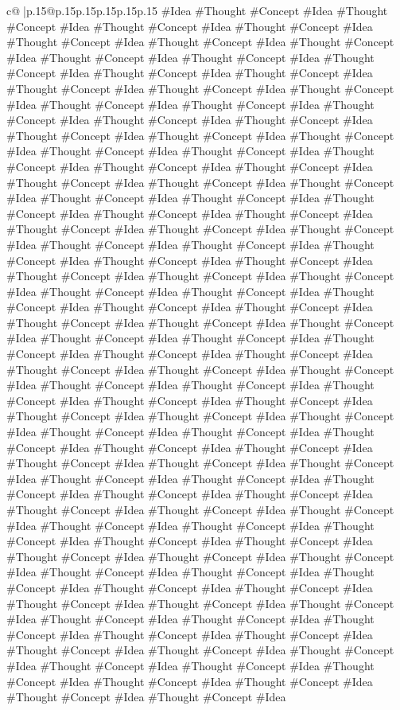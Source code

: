 \documentclass{article}
\begin{document}
{\begin{supertabular}{c@{$\;$}|p{.15\linewidth}@{}p{.15\linewidth}p{.15\linewidth}p{.15\linewidth}p{.15\linewidth}p{.15\linewidth}}
{{{\#Idea \#Thought \#Concept \#Idea \#Thought \#Concept \#Idea \#Thought \#Concept \#Idea \#Thought \#Concept \#Idea \#Thought \#Concept \#Idea \#Thought \#Concept \#Idea \#Thought \#Concept \#Idea \#Thought \#Concept \#Idea \#Thought \#Concept \#Idea \#Thought \#Concept \#Idea \#Thought \#Concept \#Idea \#Thought \#Concept \#Idea \#Thought \#Concept \#Idea \#Thought \#Concept \#Idea \#Thought \#Concept \#Idea \#Thought \#Concept \#Idea \#Thought \#Concept \#Idea \#Thought \#Concept \#Idea \#Thought \#Concept \#Idea \#Thought \#Concept \#Idea \#Thought \#Concept \#Idea \#Thought \#Concept \#Idea \#Thought \#Concept \#Idea \#Thought \#Concept \#Idea \#Thought \#Concept \#Idea \#Thought \#Concept \#Idea \#Thought \#Concept \#Idea \#Thought \#Concept \#Idea \#Thought \#Concept \#Idea \#Thought \#Concept \#Idea \#Thought \#Concept \#Idea \#Thought \#Concept \#Idea \#Thought \#Concept \#Idea \#Thought \#Concept \#Idea \#Thought \#Concept \#Idea \#Thought \#Concept \#Idea \#Thought \#Concept \#Idea \#Thought \#Concept \#Idea \#Thought \#Concept \#Idea \#Thought \#Concept \#Idea \#Thought \#Concept \#Idea \#Thought \#Concept \#Idea \#Thought \#Concept \#Idea \#Thought \#Concept \#Idea \#Thought \#Concept \#Idea \#Thought \#Concept \#Idea \#Thought \#Concept \#Idea \#Thought \#Concept \#Idea \#Thought \#Concept \#Idea \#Thought \#Concept \#Idea \#Thought \#Concept \#Idea \#Thought \#Concept \#Idea \#Thought \#Concept \#Idea \#Thought \#Concept \#Idea \#Thought \#Concept \#Idea \#Thought \#Concept \#Idea \#Thought \#Concept \#Idea \#Thought \#Concept \#Idea \#Thought \#Concept \#Idea \#Thought \#Concept \#Idea \#Thought \#Concept \#Idea \#Thought \#Concept \#Idea \#Thought \#Concept \#Idea \#Thought \#Concept \#Idea \#Thought \#Concept \#Idea \#Thought \#Concept \#Idea \#Thought \#Concept \#Idea \#Thought \#Concept \#Idea \#Thought \#Concept \#Idea \#Thought \#Concept \#Idea \#Thought \#Concept \#Idea \#Thought \#Concept \#Idea \#Thought \#Concept \#Idea \#Thought \#Concept \#Idea \#Thought \#Concept \#Idea \#Thought \#Concept \#Idea \#Thought \#Concept \#Idea \#Thought \#Concept \#Idea \#Thought \#Concept \#Idea \#Thought \#Concept \#Idea \#Thought \#Concept \#Idea \#Thought \#Concept \#Idea \#Thought \#Concept \#Idea \#Thought \#Concept \#Idea \#Thought \#Concept \#Idea \#Thought \#Concept \#Idea \#Thought \#Concept \#Idea \#Thought \#Concept \#Idea \#Thought \#Concept \#Idea \#Thought \#Concept \#Idea \#Thought \#Concept \#Idea \#Thought \#Concept \#Idea \#Thought \#Concept \#Idea \#Thought \#Concept \#Idea \#Thought \#Concept \#Idea \#Thought \#Concept \#Idea \#Thought \#Concept \#Idea \#Thought \#Concept \#Idea \#Thought \#Concept \#Idea \#Thought \#Concept \#Idea \#Thought \#Concept \#Idea \#Thought \#Concept \#Idea \#Thought \#Concept \#Idea \#Thought \#Concept \#Idea \#Thought \#Concept \#Idea \#Thought \#Concept \#Idea \#Thought \#Concept \#Idea \#Thought \#Concept \#Idea \#Thought \#Concept \#Idea \#Thought \#Concept \#Idea \#Thought \#Concept \#Idea \#Thought \#Concept \#Idea \#Thought \#Concept \#Idea \#Thought \#Concept \#Idea \#Thought \#Concept \#Idea \#Thought \#Concept \#Idea \#Thought \#Concept \#Idea \#Thought \#Concept \#Idea }}}
\end{supertabular}}
\end{document}
